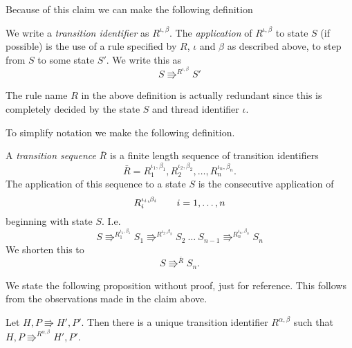 Because of this claim we can make the following definition

\begin{definition} \label{def:trans_id}
  We write a \emph{transition identifier} as $R^{\iota, \beta}$. The
  \emph{application} of $R^{\iota, \beta}$ to state $S$ (if possible) is the
  use of a rule specified by $R$, $\iota$ and $\beta$ as described above, to
  step from $S$ to some state $S'$. We write this as
  \begin{equation*}
    S \Rrightarrow^{R^{\iota, \beta}} S'
  \end{equation*}
\end{definition}

\begin{remark}
  The rule name $R$ in the above definition is actually redundant since this is
  completely decided by the state $S$ and thread identifier $\iota$.
\end{remark}

To simplify notation we make the following definition.

\begin{definition}
  A \emph{transition sequence} $\bar{R}$ is a finite length sequence of
  transition identifiers
  \begin{equation*}
    \bar{R} = R_1^{\iota_1, \beta_1}, R_2^{\iota_2, \beta_2}, \dots,
    R_n^{\iota_n, \beta_n}.
  \end{equation*}
  The application of this sequence to a state $S$ is the consecutive application
  of
  \begin{equation*}
    R_i^{\iota_i, \beta_i} \quad\quad i = 1, \dots, n
  \end{equation*}
  beginning with state $S$. I.e.
  \begin{equation*} 
    S \Rrightarrow^{R_1^{\iota_1, \beta_1}} S_1 \Rrightarrow^{R^{\iota_2,
    \beta_2}} S_2  \: \dots \: S_{n-1} \Rrightarrow^{R_n^{\iota_n, \beta_n}} S_n
  \end{equation*}
  We shorten this to
  \begin{equation*}
    S \Rrightarrow^{\bar{R}} S_n.
  \end{equation*}
\end{definition}

We state the following proposition without proof, just for reference. This
follows from the observations made in the claim above.
\begin{proposition} \label{prop:uniq_trans}
  Let $H, P \Rrightarrow H', P'$. Then there is a unique transition identifier
  $R^{\alpha, \beta}$ such that $H, P \Rrightarrow^{R^{\alpha, \beta}} H', P'$.
\end{proposition}


